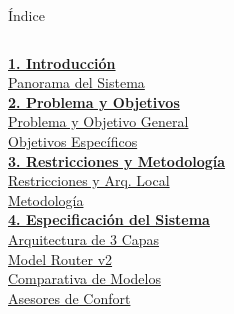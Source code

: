 
{
\begin{frame}{Índice}
  \hypertarget{indice}{}
  \small
  \begin{columns}[T]
    \hyperlink{s:intro}{\normalsize\textbf{1. Introducción}}\\
    \hspace{0.45cm}\color{darkgray}\hyperlink{s:intro}{Panorama del Sistema}\\[0.25cm]

    \hyperlink{s:problema}{\normalsize\textbf{2. Problema y Objetivos}}\\
    \hspace{0.45cm}\color{darkgray}\hyperlink{s:problema}{Problema y Objetivo General}\\
    \hspace{0.45cm}\color{darkgray}\hyperlink{s:objetivos}{Objetivos Específicos}\\[0.25cm]

    \hyperlink{s:restricciones}{\normalsize\textbf{3. Restricciones y Metodología}}\\
    \hspace{0.45cm}\color{darkgray}\hyperlink{s:restricciones}{Restricciones y Arq. Local}\\
    \hspace{0.45cm}\color{darkgray}\hyperlink{s:metodologia}{Metodología}\\[0.25cm]

    \hyperlink{s:arquitectura}{\normalsize\textbf{4. Especificación del Sistema}}\\
    \hspace{0.45cm}\color{darkgray}\hyperlink{s:arquitectura}{Arquitectura de 3 Capas}\\
    \hspace{0.45cm}\color{darkgray}\hyperlink{s:router}{Model Router v2}\\
    \hspace{0.45cm}\color{darkgray}\hyperlink{s:modelos}{Comparativa de Modelos}\\
    \hspace{0.45cm}\color{darkgray}\hyperlink{s:confort}{Asesores de Confort}


\end{columns}
\end{frame}}
